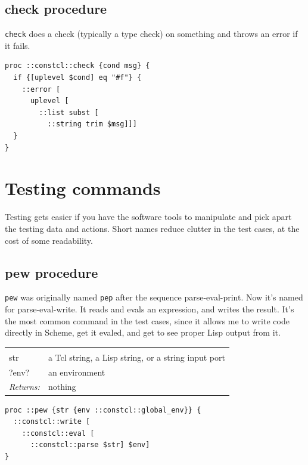 \documentclass[twoside]{report}
\begin{document}
\subsection{check procedure}
\label{check-procedure}

\texttt{check} does a check (typically a type check) on something and throws an error if it fails.

\begin{lstlisting}
proc ::constcl::check {cond msg} {
  if {[uplevel $cond] eq "#f"} {
    ::error [
      uplevel [
        ::list subst [
          ::string trim $msg]]]
  }
}
\end{lstlisting}

\section{Testing commands}
\label{testing-commands}

Testing gets easier if you have the software tools to manipulate and pick apart the testing data and actions. Short names reduce clutter in the test cases, at the cost of some readability.

\subsection{pew procedure}
\label{pew-procedure}

\texttt{pew} was originally named \texttt{pep} after the sequence parse-eval-print. Now it's named for parse-eval-write. It reads and evals an expression, and writes the result. It's the most common command in the test cases, since it allows me to write code directly in Scheme, get it evaled, and get to see proper Lisp output from it.

\noindent\begin{tabular}{ |p{1.9cm} p{8cm}| }
\hline
\rowcolor[HTML]{CCCCCC} \multicolumn{2}{|l|}{\bf pew (internal)} \\
str & a Tcl string, a Lisp string, or a string input port \\
?env? & an environment \\
\textit{Returns:} & nothing \\
\hline
\end{tabular}

\begin{lstlisting}
proc ::pew {str {env ::constcl::global_env}} {
  ::constcl::write [
    ::constcl::eval [
      ::constcl::parse $str] $env]
}
\end{lstlisting}
\end{document}
